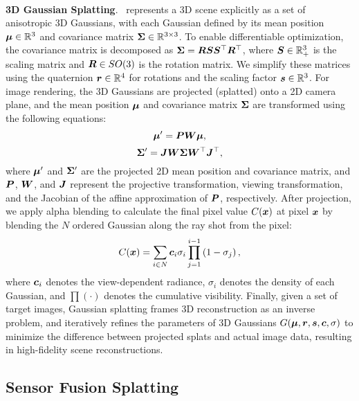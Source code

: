 \noindent
\\
\textbf{3D Gaussian Splatting}. \gs~represents a 3D scene explicitly as a set of anisotropic 3D Gaussians, with 
each Gaussian defined by its mean position $\bm{\mu}\in\mathbb{R}^3$ and covariance matrix $\bm{\Sigma}\in\mathbb{R}^{3\times3}$.
To enable differentiable optimization, the covariance matrix is decomposed as $\bm{\Sigma}=\bm{R}\bm{S}\bm{S}^\top\bm{R}^\top$, where $\bm{S}\in\mathbb{R}^3_+$ is the scaling matrix and $\bm{R}\in SO(3)$ is the rotation matrix. 
We simplify these matrices using the 
quaternion $\bm{r}\in\mathbb{R}^4$ for rotations and the scaling factor $\bm{s}\in\mathbb{R}^3$. 
For image rendering, the 3D Gaussians are projected (splatted) onto a 2D camera plane, and the mean position $\bm{\mu}$ and covariance matrix $\bm{\Sigma}$ are transformed using
the following equations:
\begin{equation}
\bm{\mu}^{\prime}=\bm{P} \bm{W} \bm{\mu},
\end{equation}
\begin{equation}
\bm{\Sigma}^{\prime}=\bm{J}\bm{W} \bm{\Sigma} \bm{W}^\top \bm{J}^\top,
\end{equation}
where $\bm{\mu}^{\prime}$ and $\bm{\Sigma}^\prime$ are the projected 2D mean position and covariance matrix, and $\bm{P}$, $\bm{W}$, and $\bm{J}$ represent the projective transformation, viewing transformation, and the Jacobian of the affine approximation of $\bm{P}$, respectively. 
After projection, we apply alpha blending to calculate the final pixel value $C(\bm{x})$ at pixel $\bm{x}$ by blending the $N$ ordered Gaussian along the ray shot from the pixel:
\begin{equation}
\label{alpha_blending}
C(\bm{x})=\sum_{i \in N} \bm{c}_i \sigma_i \prod_{j=1}^{i-1}\left(1-\sigma_j\right),
\end{equation}
where $\bm{c}_i$ denotes the view-dependent radiance,
$\sigma_i$ denotes the density of each Gaussian, and $\prod(\cdot)$ denotes the cumulative visibility.
Finally, given a set of target images, Gaussian splatting frames 3D reconstruction as an inverse problem, and iteratively refines the parameters of 3D Gaussians $G(\bm{\mu}, \bm{r}, \bm{s}, \bm{c}, \sigma)$ to minimize the difference between projected splats and actual image data, resulting in high-fidelity scene reconstructions.








\subsection{Sensor Fusion Splatting}
\label{subsec:event-splatting}

